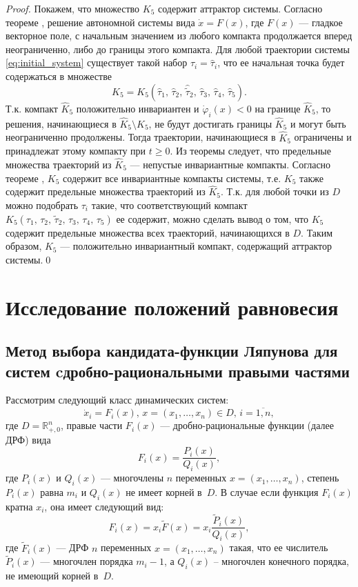 \documentclass[14pt,a4paper]{extarticle}
\begin{document}
\begin{proof}
		Покажем, что множество $K_5$ содержит аттрактор системы. Согласно теореме , решение автономной системы вида $\dot{x}=F(x)$, где $F(x)$ --- гладкое векторное поле, с начальным значением из любого компакта продолжается вперед неограниченно, либо до границы этого компакта. Для любой траектории системы \ref{eq:initial_system} существует такой набор $\tau_i = \hat{\tau}_i$, что ее начальная точка будет содержаться в множестве 
		\[\hat{K}_5 = K_5(\hat\tau_1,\,\hat\tau_2,\,\hat{\tilde{\tau}}_2,\,\hat\tau_3,\,\hat\tau_4,\,\hat\tau_5).\]
		Т.к. компакт $\hat{K}_5$ положительно инвариантен и $\dot{\varphi}_i(x)<0$ на границе $\hat{K}_5$, то решения, начинающиеся в $\hat{K}_5\setminus K_5$, не будут достигать границы $\hat{K}_5$ и могут быть неограниченно продолжены. Тогда траектории, начинающиеся в $\hat{K}_5$ ограничены и принадлежат этому компакту при $t\ge0$. Из теоремы  следует, что предельные множества траекторий из $\hat{K}_5$ --- непустые инвариантные компакты. Согласно теореме , $K_5$ содержит все инвариантные компакты системы, т.е. $K_5$ также содержит предельные множества траекторий из $\hat{K}_5$. Т.к. для любой точки из $D$ можно подобрать $\tau_i$ такие, что соответствующий компакт $K_5(\tau_1,\,\tau_2,\,\tilde{\tau}_2,\,\tau_3,\,\tau_4,\,\tau_5)$ ее содержит, можно сделать вывод о том, что $K_5$ содержит предельные множества всех траекторий, начинающихся в $D$. Таким образом, $K_5$ --- положительно инвариантный компакт, содержащий аттрактор системы.\qed
		
	\end{proof}	
	
	\section{Исследование положений равновесия}
	\subsection{Метод выбора кандидата-функции Ляпунова для систем c\linebreak дробно-рациональными правыми частями}
	
	Рассмотрим следующий класс динамических систем:
	\[\dot{x}_i=F_i(x),\, x=(x_1,\ldots,x_n)\in D,\, i=\overline{1,n},\]
	где $D = \mathbb{R}^{n}_{+,0}$, правые части $F_i(x)$ --- дробно-рациональные функции (далее ДРФ) вида 
	\[F_i(x)=\dfrac{P_i(x)}{Q_i(x)},\]
	где $P_i(x)$ и $Q_i(x)$ --- многочлены $n$ переменных $x=(x_1,\ldots,x_n)$, степень $P_i(x)$ равна $m_i$ и $Q_i(x)$ не имеет корней в~$D$. В случае если функция $F_i(x)$ кратна $x_i$, она имеет следующий вид:
	\[F_i(x)=x_i\tilde{F}(x) = x_i\dfrac{\tilde{P}_i(x)}{Q_i(x)},\]
	где $\tilde{F}_i(x)$ --- ДРФ $n$ переменных $x=(x_1,\ldots,x_n)$ такая, что ее числитель $\tilde{P}_i(x)$ --- многочлен порядка $m_i-1$, а $Q_i(x)$ -- многочлен конечного порядка, не имеющий корней в~$D$.
	
\end{document}
